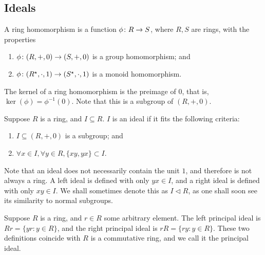\subsection{Ideals}

\begin{definition}
    A ring homomorphism is a function \(\phi\colon R\to S\),
    where \(R,S\) are rings,
    with the properties
    \begin{enumerate}[label={(\roman*)}, itemsep=0mm]
        \item \(\phi\colon(R,+,0)\to(S,+,0)\) is a group homomorphism; and
        \item \(\phi\colon(R^\star,\cdot,1)\to(S^\star,\cdot,1)\)
            is a monoid homomorphism.
    \end{enumerate}
\end{definition}
\begin{definition}
    The kernel of a ring homomorphism
    is the preimage of \(0\),
    that is, \(\ker(\phi) = \phi^{-1}(0)\).
    Note that this is a subgroup of \((R,+,0)\).
\end{definition}

\begin{definition}
    Suppose \(R\) is a ring, and \(I \subseteq R\).
    \(I\) is an ideal if it fits the following criteria:
    \begin{enumerate}[label={(\roman*)}, itemsep=0mm]
        \item \(I \subseteq (R,+,0)\) is a subgroup; and
        \item \(\forall x \in I, \forall y \in R, \{xy,yx\} \subset I\).
    \end{enumerate}
    Note that an ideal does not necessarily contain the unit \(1\),
    and therefore is not always a ring.
    A left ideal is defined with only \(yx \in I\),
    and a right ideal is defined with only \(xy \in I\).
    We shall sometimes denote this as \(I \lhd R\),
    as one shall soon see its similarity to normal subgroups.
\end{definition}

\begin{definition}
    Suppose \(R\) is a ring, and \(r \in R\) some arbitrary element.
    The left principal ideal is \(Rr = \{yr : y \in R\}\),
    and the right principal ideal is \(rR = \{ry : y \in R\}\).
    These two definitions coincide with \(R\) is a commutative ring,
    and we call it the principal ideal.
\end{definition}

